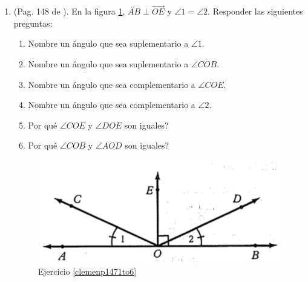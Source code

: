 \begin{enumerate}
	\item \label{clemenp1471to6} (Pag. 148 de \cite{clemens}). En la figura \ref{figclemenp1471to6}, $\overleftrightarrow{AB} \perp \overrightarrow{OE}$ y $\angle 1 = \angle 2$. Responder las siguientes preguntas:
	\begin{enumerate}[label=\Alph*) ]
		\item Nombre un ángulo que sea suplementario a $\angle 1$.
		\item Nombre un ángulo que sea suplementario a $\angle COB$.
		\item Nombre un ángulo que sea complementario a $\angle COE $.
		\item Nombre un ángulo que sea complementario a $\angle 2$.	
		\item Por qué $\angle COE$ y $\angle DOE$ son iguales?
		\item Por qué $\angle COB$ y $\angle AOD$ son iguales?									
	\end{enumerate}
	\begin{figure}[H]
		\centering
		\includegraphics[width=0.5\linewidth]{Geometria/imgs/clemenp1471to6}
		\caption{Ejercicio \ref{clemenp1471to6}}
		\label{figclemenp1471to6}
	\end{figure}
	

\end{enumerate}
